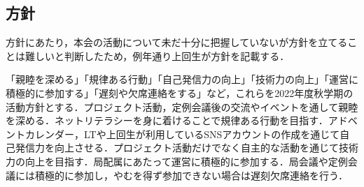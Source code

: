 \subsection*{\firstGrade{}方針}


\firstGrade{}方針にあたり，本会の活動について未だ十分に把握していない\firstGrade{}が方針を立てることは難しいと判断したため，例年通り上回生が\firstGrade{}方針を記載する．

「親睦を深める」「規律ある行動」「自己発信力の向上」「技術力の向上」「運営に積極的に参加する」「遅刻や欠席連絡をする」など，これらを\firstGrade{}2022年度秋学期の活動方針とする．プロジェクト活動，定例会議後の交流やイベントを通して親睦を深める．ネットリテラシーを身に着けることで規律ある行動を目指す．アドベントカレンダー，LTや上回生が利用しているSNSアカウントの作成を通じて自己発信力を向上させる．プロジェクト活動だけでなく自主的な活動を通じて技術力の向上を目指す．局配属にあたって運営に積極的に参加する．局会議や定例会議には積極的に参加し，やむを得ず参加できない場合は遅刻欠席連絡を行う．
